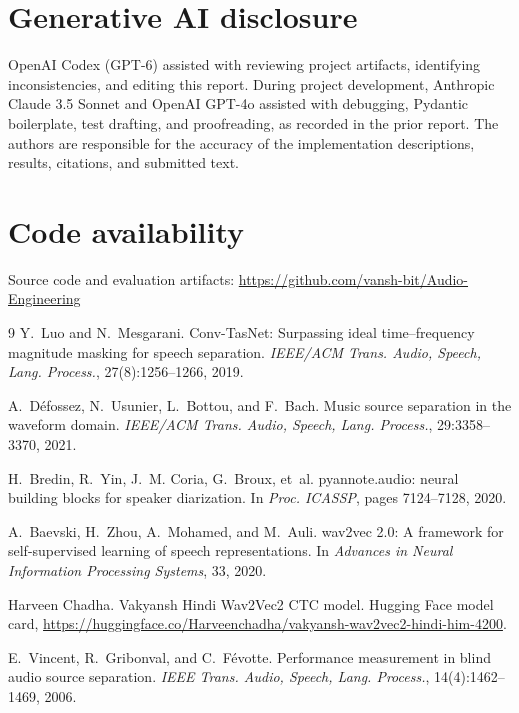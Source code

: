 \documentclass[11pt,a4paper,twocolumn]{article}
\newcommand{\githuburl}{https://github.com/vansh-bit/Audio-Engineering}
\begin{document}
\section*{Generative AI disclosure}
OpenAI Codex (GPT-6) assisted with reviewing project artifacts, identifying inconsistencies, and editing this report. During project development, Anthropic Claude 3.5 Sonnet and OpenAI GPT-4o assisted with debugging, Pydantic boilerplate, test drafting, and proofreading, as recorded in the prior report. The authors are responsible for the accuracy of the implementation descriptions, results, citations, and submitted text.

\section*{Code availability}
\noindent Source code and evaluation artifacts: \url{\githuburl}

\begin{thebibliography}{9}
Y.~Luo and N.~Mesgarani.
\newblock Conv-TasNet: Surpassing ideal time--frequency magnitude masking for speech separation.
\newblock \emph{IEEE/ACM Trans. Audio, Speech, Lang. Process.}, 27(8):1256--1266, 2019.

A.~D{\'e}fossez, N.~Usunier, L.~Bottou, and F.~Bach.
\newblock Music source separation in the waveform domain.
\newblock \emph{IEEE/ACM Trans. Audio, Speech, Lang. Process.}, 29:3358--3370, 2021.

H.~Bredin, R.~Yin, J.~M. Coria, G.~Broux, et~al.
\newblock pyannote.audio: neural building blocks for speaker diarization.
\newblock In \emph{Proc. ICASSP}, pages 7124--7128, 2020.

A.~Baevski, H.~Zhou, A.~Mohamed, and M.~Auli.
\newblock wav2vec 2.0: A framework for self-supervised learning of speech representations.
\newblock In \emph{Advances in Neural Information Processing Systems}, 33, 2020.

Harveen Chadha.
\newblock Vakyansh Hindi Wav2Vec2 CTC model.
\newblock Hugging Face model card, \url{https://huggingface.co/Harveenchadha/vakyansh-wav2vec2-hindi-him-4200}.

E.~Vincent, R.~Gribonval, and C.~F{\'e}votte.
\newblock Performance measurement in blind audio source separation.
\newblock \emph{IEEE Trans. Audio, Speech, Lang. Process.}, 14(4):1462--1469, 2006.
\end{thebibliography}
\end{document}

